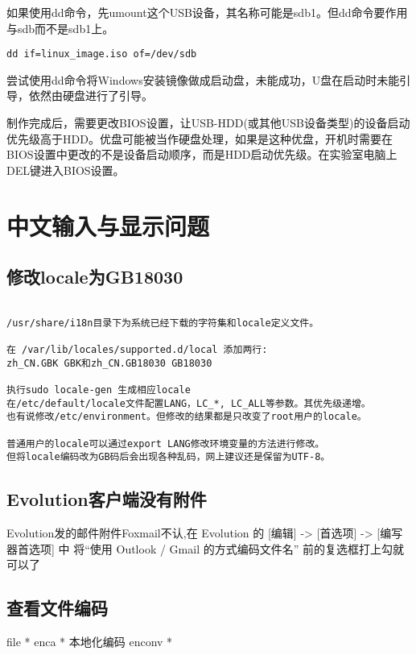 如果使用dd命令，先umount这个USB设备，其名称可能是sdb1。但dd命令要作用与sdb而不是sdb1上。
\begin{verbatim}
dd if=linux_image.iso of=/dev/sdb
\end{verbatim}
尝试使用dd命令将Windows安装镜像做成启动盘，未能成功，U盘在启动时未能引导，依然由硬盘进行了引导。

制作完成后，需要更改BIOS设置，让USB-HDD(或其他USB设备类型)的设备启动优先级高于HDD。优盘可能被当作硬盘处理，如果是这种优盘，开机时需要在BIOS设置中更改的不是设备启动顺序，而是HDD启动优先级。在实验室电脑上DEL键进入BIOS设置。


\section{中文输入与显示问题}

\subsection{修改locale为GB18030}

\begin{verbatim}

/usr/share/i18n目录下为系统已经下载的字符集和locale定义文件。

在 /var/lib/locales/supported.d/local 添加两行:
zh_CN.GBK GBK和zh_CN.GB18030 GB18030 

执行sudo locale-gen 生成相应locale
在/etc/default/locale文件配置LANG，LC_*, LC_ALL等参数。其优先级递增。
也有说修改/etc/environment。但修改的结果都是只改变了root用户的locale。

普通用户的locale可以通过export LANG修改环境变量的方法进行修改。
但将locale编码改为GB码后会出现各种乱码，网上建议还是保留为UTF-8。

\end{verbatim}




\subsection{Evolution客户端没有附件}
Evolution发的邮件附件Foxmail不认,在 Evolution 的 [编辑] -> [首选项] -> [编写器首选项] 中
将“使用 Outlook / Gmail 的方式编码文件名” 前的复选框打上勾就可以了

\subsection{查看文件编码}
\begin{shellcmd}
file *
enca *
本地化编码 enconv *
\end{shellcmd}

